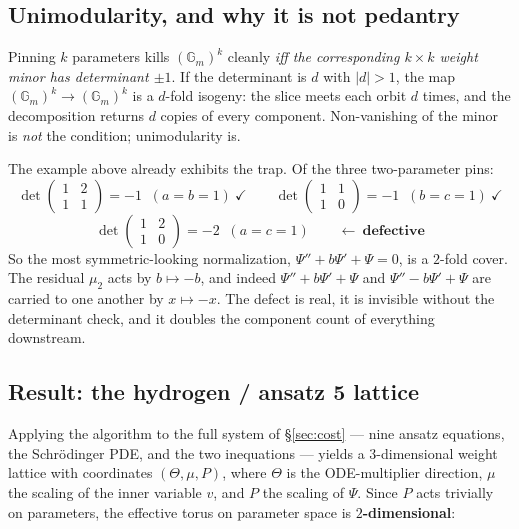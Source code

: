 \documentclass[11pt]{article}
\newcommand{\Gm}{\mathbb{G}_m}
\theoremstyle{plain}
\theoremstyle{definition}
\theoremstyle{remark}
\begin{document}
\subsection{Unimodularity, and why it is not pedantry}
\label{sec:unimodular}

Pinning $k$ parameters kills $(\Gm)^k$ cleanly \emph{iff the corresponding
$k \times k$ weight minor has determinant $\pm 1$}. If the determinant is $d$
with $|d| > 1$, the map $(\Gm)^k \to (\Gm)^k$ is a $d$-fold isogeny: the slice
meets each orbit $d$ times, and the decomposition returns $d$ copies of every
component. Non-vanishing of the minor is \emph{not} the condition;
unimodularity is.

The example above already exhibits the trap. Of the three two-parameter pins:
\[
  \det\begin{pmatrix}1&2\\1&1\end{pmatrix} = -1 \;\;(a{=}b{=}1)\ \checkmark
  \qquad
  \det\begin{pmatrix}1&1\\1&0\end{pmatrix} = -1 \;\;(b{=}c{=}1)\ \checkmark
\]
\[
  \det\begin{pmatrix}1&2\\1&0\end{pmatrix} = -2 \;\;(a{=}c{=}1)
  \qquad\longleftarrow\ \textbf{defective}
\]
So the most symmetric-looking normalization, $\Psi'' + b\Psi' + \Psi = 0$, is
a $2$-fold cover. The residual $\mu_2$ acts by $b \mapsto -b$, and indeed
$\Psi'' + b\Psi' + \Psi$ and $\Psi'' - b\Psi' + \Psi$ are carried to one
another by $x \mapsto -x$. The defect is real, it is invisible without the
determinant check, and it doubles the component count of everything
downstream.

\subsection{Result: the hydrogen / ansatz 5 lattice}
\label{sec:hydrogen}

Applying the algorithm to the full system of \S\ref{sec:cost} --- nine ansatz
equations, the Schr\"odinger PDE, and the two inequations --- yields a
$3$-dimensional weight lattice with coordinates $(\Theta, \mu, P)$, where
$\Theta$ is the ODE-multiplier direction, $\mu$ the scaling of the inner
variable $v$, and $P$ the scaling of $\Psi$. Since $P$ acts trivially on
parameters, the effective torus on parameter space is \textbf{$2$-dimensional}:
\end{document}
